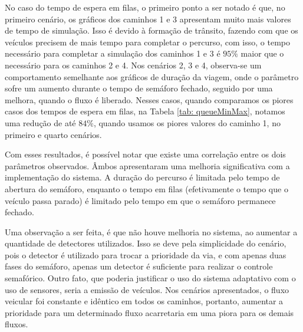 No caso do tempo de espera em filas, o primeiro ponto a ser notado é que, no primeiro cenário, os gráficos dos caminhos 1 e 3 apresentam muito mais valores de tempo de simulação. Isso é devido à formação de trânsito, fazendo com que os veículos precisem de mais tempo para completar o percurso, com isso, o tempo necessário para completar a simulação dos caminhos 1 e 3 é $95\%$ maior que o necessário para os caminhos 2 e 4.
Nos cenários 2, 3 e 4, observa-se um comportamento semelhante aos gráficos de duração da viagem, onde o parâmetro sofre um aumento durante o tempo de semáforo fechado, seguido por uma melhora, quando o fluxo é liberado.
Nesses casos, quando comparamos os piores casos dos tempos de espera em filas, na Tabela \ref{tab: queueMinMax}, notamos uma redução de até $84\%$, quando usamos os piores valores do caminho 1, no primeiro e quarto cenários.

Com esses resultados, é possível notar que existe uma correlação entre os dois parâmetros observados. Âmbos apresentaram uma melhoria significativa com a implementação do sistema. A duração do percurso é limitada pelo tempo de abertura do semáforo, enquanto o tempo em filas (efetivamente o tempo que o veículo passa parado) é limitado pelo tempo em que o semáforo permanece fechado.

Uma observação a ser feita, é que não houve melhoria no sistema, ao aumentar a quantidade de detectores utilizados. Isso se deve pela simplicidade do cenário, pois o detector é utilizado para trocar a prioridade da via, e com apenas duas fases do semáforo, apenas um detector é suficiente para realizar o controle semafórico. Outro fato, que poderia justificar o uso do sistema adaptativo com o uso de sensores, seria a emissão de veículos. Nos cenários apresentados, o fluxo veicular foi constante e idêntico em todos os caminhos, portanto, aumentar a prioridade para um determinado fluxo acarretaria em uma piora para os demais fluxos.